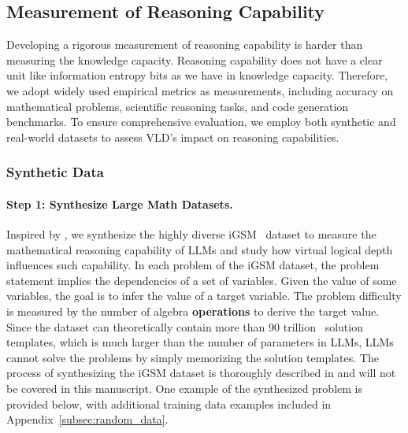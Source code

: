 \documentclass{article} %
\begin{document}
\subsection{Measurement of Reasoning Capability} \label{subsec:reasoning-measurement}

Developing a rigorous measurement of reasoning capability is harder than measuring the knowledge capacity. Reasoning capability does not have a clear unit like information entropy bits as we have in knowledge capacity. Therefore, we adopt widely used empirical metrics as measurements, including accuracy on mathematical problems, scientific reasoning tasks, and code generation benchmarks. To ensure comprehensive evaluation, we employ both synthetic and real-world datasets to assess VLD's impact on reasoning capabilities.


\subsubsection{Synthetic Data}


\paragraph{Step 1: Synthesize Large Math Datasets.} Inspired by \citep{ye2024physics}, we synthesize the highly diverse iGSM~\citep{ye2024physics, cobbe2021training} dataset to measure the mathematical reasoning capability of LLMs and study how virtual logical depth influences such capability. In each problem of the iGSM dataset, the problem statement implies the dependencies of a set of variables. Given the value of some variables, the goal is to infer the value of a target variable. The problem difficulty is measured by the number of algebra \textbf{operations} to derive the target value. Since the dataset can theoretically contain more than 90 trillion~\citep{ye2024physics} solution templates, which is much larger than the number of parameters in LLMs, LLMs cannot solve the problems by simply memorizing the solution templates. The process of synthesizing the iGSM dataset is thoroughly described in \citep{ye2024physics} and will not be covered in this manuscript. One example of the synthesized problem is provided below, with additional training data examples included in Appendix~\ref{subsec:random_data}.
\end{document}
